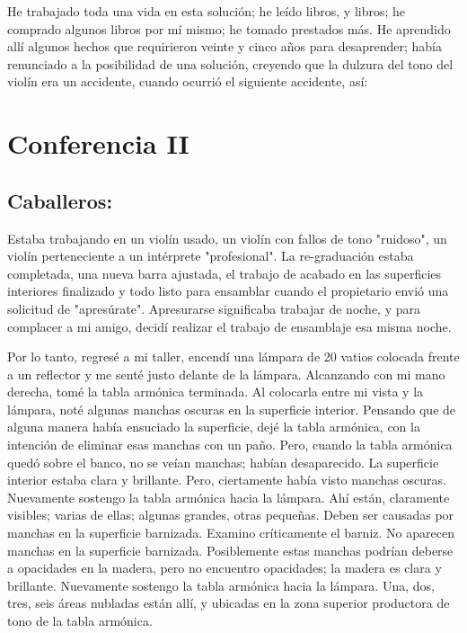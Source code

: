 \documentclass[12pt]{book}
\begin{document}
He trabajado toda una vida en esta solución; he leído libros, y libros; he comprado algunos libros por mí mismo; he tomado prestados más. He aprendido allí algunos hechos que requirieron veinte y cinco años para desaprender; había renunciado a la posibilidad de una solución, creyendo que la dulzura del tono del violín era un accidente, cuando ocurrió el siguiente accidente, así:

\chapter *{Conferencia II}
\section*{Caballeros:}

Estaba trabajando en un violín usado, un violín con fallos de tono "ruidoso", un violín perteneciente a un intérprete "profesional". La re-graduación estaba completada, una nueva barra ajustada, el trabajo de acabado en las superficies interiores finalizado y todo listo para ensamblar cuando el propietario envió una solicitud de "apresúrate". Apresurarse significaba trabajar de noche, y para complacer a mi amigo, decidí realizar el trabajo de ensamblaje esa misma noche.

Por lo tanto, regresé a mi taller, encendí una lámpara de 20 vatios colocada frente a un reflector y me senté justo delante de la lámpara. Alcanzando con mi mano derecha, tomé la tabla armónica terminada. Al colocarla entre mi vista y la lámpara, noté algunas manchas oscuras en la superficie interior. Pensando que de alguna manera había ensuciado la superficie, dejé la tabla armónica, con la intención de eliminar esas manchas con un paño. Pero, cuando la tabla armónica quedó sobre el banco, no se veían manchas; habían desaparecido. La superficie interior estaba clara y brillante. Pero, ciertamente había visto manchas oscuras. Nuevamente sostengo la tabla armónica hacia la lámpara. Ahí están, claramente visibles; varias de ellas; algunas grandes, otras pequeñas. Deben ser causadas por manchas en la superficie barnizada. Examino críticamente el barniz. No aparecen manchas en la superficie barnizada. Posiblemente estas manchas podrían deberse a opacidades en la madera, pero no encuentro opacidades; la madera es clara y brillante. Nuevamente sostengo la tabla armónica hacia la lámpara. Una, dos, tres, seis áreas nubladas están allí, y ubicadas en la zona superior productora de tono de la tabla armónica.
\end{document}
